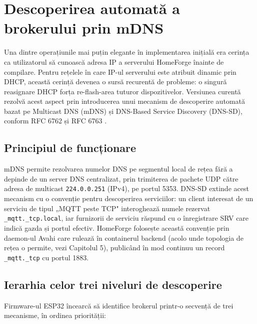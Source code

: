 \section{Descoperirea automată a brokerului prin mDNS}
\label{sec:firmware-mdns}
Una dintre operațiunile mai puțin elegante în implementarea inițială era cerința ca utilizatorul să cunoască adresa IP a serverului HomeForge înainte de compilare. Pentru rețelele în care IP-ul serverului este atribuit dinamic prin DHCP, această cerință devenea o sursă recurentă de probleme: o singură reasignare DHCP forța re-flash-area tuturor dispozitivelor. Versiunea curentă rezolvă acest aspect prin introducerea unui mecanism de descoperire automată bazat pe Multicast DNS (mDNS) și DNS-Based Service Discovery (DNS-SD), conform RFC 6762 \cite{rfc_mdns} și RFC 6763 \cite{rfc_dnssd}.

\subsection{Principiul de funcționare}
mDNS permite rezolvarea numelor DNS pe segmentul local de rețea fără a depinde de un server DNS centralizat, prin trimiterea de pachete UDP către adresa de multicast \texttt{224.0.0.251} (IPv4), pe portul 5353. DNS-SD extinde acest mecanism cu o convenție pentru descoperirea serviciilor: un client interesat de un serviciu de tipul „MQTT peste TCP" interoghează numele rezervat \texttt{\_mqtt.\_tcp.local}, iar furnizorii de serviciu răspund cu o înregistrare SRV care indică gazda și portul efectiv. HomeForge folosește această convenție prin daemon-ul Avahi care rulează în containerul backend (acolo unde topologia de rețea o permite, vezi Capitolul 5), publicând în mod continuu un record \texttt{\_mqtt.\_tcp} cu portul 1883.

\subsection{Ierarhia celor trei niveluri de descoperire}
Firmware-ul ESP32 încearcă să identifice brokerul printr-o secvență de trei mecanisme, în ordinea priorității:

